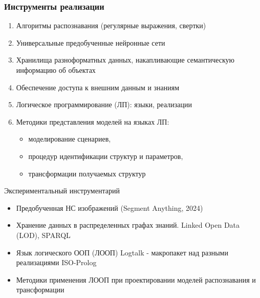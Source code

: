 \documentclass[10pt]{beamer}
\begin{document}
\begin{frame}
  \frametitle{Инструменты реализации}
  \begin{enumerate}
  \item Алгоритмы распознавания (регулярные выражения, свертки)
  \item Универсальные предобученные нейронные сети
  \item Хранилища разноформатных данных, накапливающие семантическую информацию об объектах
  \item Обеспечение доступа к внешним данным и знаниям
  \item Логическое программирование (ЛП): языки, реализации
  \item Методики представления моделей на языках ЛП:
    \begin{itemize}
    \item моделирование сценариев,
    \item процедур идентификации структур и параметров,
    \item трансформации получаемых структур
    \end{itemize}
  \end{enumerate}
  Экспериментальный инструментарий
  \begin{itemize}
  \item Предобученная НС изображений (Segment Anything, 2024)
  \item Хранение данных в распределенных графах знаний. Linked Open Data (LOD), SPARQL
  \item Язык логического ООП (ЛООП) Logtalk - макропакет над разными реализациями ISO-Prolog
    \item Методики применения ЛООП при проектировании моделей распознавания и трансформации
  \end{itemize}
\end{frame}
\end{document}
